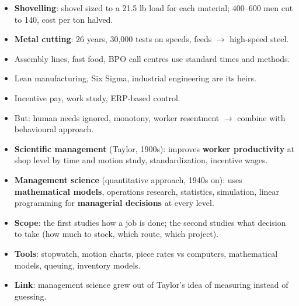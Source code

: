 {\begin{itemize}
    by method study, rest periods and incentive pay, output rose \textbf{12.5 $\rightarrow$
    47.5 tons/day} (AJ Sir's figures: 12.7 $\rightarrow$ 48.8), wages \textbf{\$1.15
    $\rightarrow$ \$1.85}.
  \item \textbf{Shovelling}: shovel sized to a 21.5 lb load for each material; 400--600 men
    cut to 140, cost per ton halved.
  \item \textbf{Metal cutting}: 26 years, 30{,}000 tests on speeds, feeds $\rightarrow$
    high-speed steel.
\end{itemize}
\begin{itemize}
  \item Assembly lines, fast food, BPO call centres use standard times and methods.
  \item Lean manufacturing, Six Sigma, industrial engineering are its heirs.
  \item Incentive pay, work study, ERP-based control.
  \item But: human needs ignored, monotony, worker resentment $\rightarrow$ combine with
    behavioural approach.
\end{itemize}}

{\color{sub}\footnotesize {} }
\begin{itemize}
  \item \textbf{Scientific management} (Taylor, 1900s): improves \textbf{worker productivity}
    at shop level by time and motion study, standardization, incentive wages.
  \item \textbf{Management science} (quantitative approach, 1940s on): uses
    \textbf{mathematical models}, operations research, statistics, simulation, linear
    programming for \textbf{managerial decisions} at every level.
  \item \textbf{Scope}: the first studies how a job is done; the second studies what
    decision to take (how much to stock, which route, which project).
  \item \textbf{Tools}: stopwatch, motion charts, piece rates vs computers, mathematical
    models, queuing, inventory models.
  \item \textbf{Link}: management science grew out of Taylor's idea of measuring instead of
    guessing.
\end{itemize}

